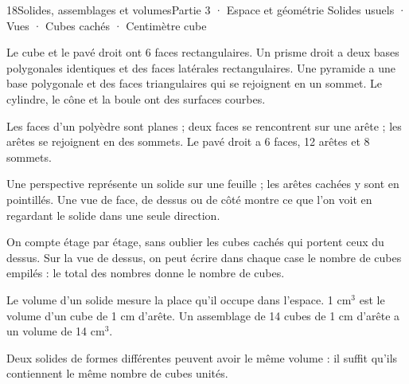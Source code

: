 \begin{ouverture}[espace]{18}{Solides, assemblages et volumes}{Partie 3 · Espace et géométrie}
{Solides usuels · Vues · Cubes cachés · Centimètre cube}
\end{ouverture}
\pagestyle{otMain}\essentiel\fontsize{11}{15}\selectfont
{}\label{cours-18-1}
\begin{definition}Le cube et le pavé droit ont 6 faces rectangulaires. Un prisme droit a deux bases polygonales identiques et des faces latérales rectangulaires. Une pyramide a une base polygonale et des faces triangulaires qui se rejoignent en un sommet. Le cylindre, le cône et la boule ont des surfaces courbes.\end{definition}
\label{fig-cours-18-1-cours-solides}

\begin{propriete}Les faces d’un polyèdre sont planes ; deux faces se rencontrent sur une arête ; les arêtes se rejoignent en des sommets. Le pavé droit a 6 faces, 12 arêtes et 8 sommets.\end{propriete}
\begin{definition}Une perspective représente un solide sur une feuille ; les arêtes cachées y sont en pointillés. Une vue de face, de dessus ou de côté montre ce que l’on voit en regardant le solide dans une seule direction.\end{definition}
\clearpage
{}\label{cours-18-2}
\label{fig-cours-18-2-cours-assemblage-vues}

\begin{savoirfaire}On compte étage par étage, sans oublier les cubes cachés qui portent ceux du dessus. Sur la vue de dessus, on peut écrire dans chaque case le nombre de cubes empilés : le total des nombres donne le nombre de cubes.\end{savoirfaire}
\begin{definition}Le volume d’un solide mesure la place qu’il occupe dans l’espace. 1 cm$^3$ est le volume d’un cube de 1 cm d’arête. Un assemblage de 14 cubes de 1 cm d’arête a un volume de 14 cm$^3$.\end{definition}
\begin{attention}Deux solides de formes différentes peuvent avoir le même volume : il suffit qu’ils contiennent le même nombre de cubes unités.\end{attention}

